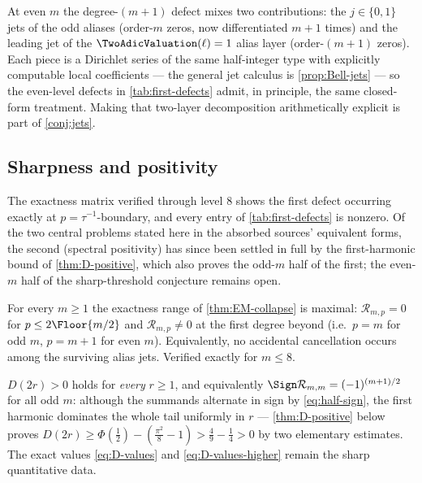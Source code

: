 \documentclass[11pt,oneside]{article}
\numberwithin{equation}{section}
\theoremstyle{definition}
\theoremstyle{remark}
\newcommand{\defect}{\mathcal R}
\begin{document}
\begin{remark}
At even $m$ the degree-$(m{+}1)$ defect mixes two contributions: the
$j\in\{0,1\}$ jets of the odd aliases (order-$m$ zeros, now
differentiated $m{+}1$ times) and the leading jet of the
$\TwoAdicValuation(\ell)=1$ alias layer (order-$(m{+}1)$ zeros).  Each piece is a
Dirichlet series of the same half-integer type with explicitly
computable local coefficients --- the general jet calculus is
\cref{prop:Bell-jets} --- so the even-level defects in
\cref{tab:first-defects} admit, in principle, the same closed-form
treatment.  Making that two-layer decomposition arithmetically
explicit is part of \cref{conj:jets}.
\end{remark}

\subsection{Sharpness and positivity}

The exactness matrix verified through level $8$ shows the first defect
occurring exactly at $p=\tau^{-1}$-boundary, and every entry of
\cref{tab:first-defects} is nonzero.  Of the two central problems
stated here in the absorbed sources' equivalent forms, the second
(spectral positivity) has since been settled in full by the
first-harmonic bound of \cref{thm:D-positive}, which also proves the
odd-$m$ half of the first; the even-$m$ half of the sharp-threshold
conjecture remains open.

\begin{conjecture}
\label{conj:exact-degree}
For every $m\ge1$ the exactness range of \cref{thm:EM-collapse} is
maximal: $\defect_{m,p}=0$ for $p\le2\Floor{m/2}$ and
$\defect_{m,p}\ne0$ at the first degree beyond
(i.e.\ $p=m$ for odd $m$, $p=m+1$ for even $m$).  Equivalently, no
accidental cancellation occurs among the surviving alias jets.
Verified exactly for $m\le8$.
\end{conjecture}

\begin{remark}
\label{conj:positivity}
$D(2r)>0$ holds for \emph{every} $r\ge1$, and equivalently
$\Sign\defect_{m,m}=(-1)^{(m+1)/2}$ for all odd $m$: although the
summands alternate in sign by \eqref{eq:half-sign}, the first
harmonic dominates the whole tail uniformly in $r$ ---
\cref{thm:D-positive} below proves
$D(2r)\ge\Phi(\tfrac12)-(\tfrac{\pi^2}8-1)>\tfrac49-\tfrac14>0$
by two elementary estimates.  The exact values \eqref{eq:D-values}
and \eqref{eq:D-values-higher} remain the sharp quantitative data.
\end{remark}
\end{document}

